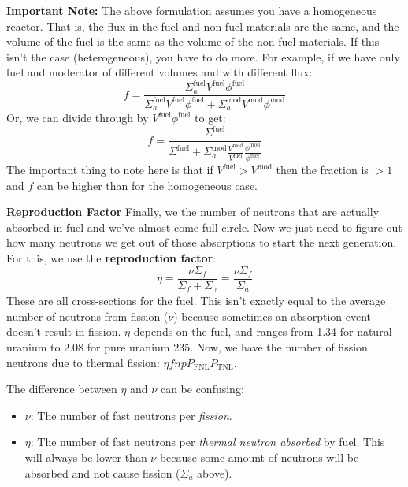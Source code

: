 \documentclass[letter]{article}
\begin{document}
\begin{framed}
\textbf{Important Note:} The above formulation assumes you have a
homogeneous reactor. That is, the flux in the fuel and non-fuel
materials are the same, and the volume of the fuel is the same as the
volume of the non-fuel materials. If this isn't the case (heterogeneous), you have to
do more. For example, if we have only fuel and moderator of different
volumes and with different flux:
\begin{equation*}
  f=\frac{\Sigma^{\text{fuel}}_aV^{\text{fuel}}\phi^{\text{fuel}}}{\Sigma^{\text{fuel}}_aV^{\text{fuel}}\phi^{\text{fuel}}+\Sigma^{\text{mod}}_aV^{\text{mod}}\phi^{\text{mod}}}
\end{equation*}
Or, we can divide through by $V^{\text{fuel}}\phi^{\text{fuel}}$ to
get:
\begin{equation*}
  f=\frac{\Sigma^{\text{fuel}}}{\Sigma^{\text{fuel}}+\Sigma^{\text{mod}}_a\frac{V^{\text{mod}}}{V^{\text{fuel}}}\frac{\phi^{\text{mod}}}{\phi^{\text{fuel}}}}
\end{equation*}
The important thing to note here is that if
$V^{\text{fuel}}>V^{\text{mod}}$ then the fraction is $>1$ and $f$ can
be higher than for the homogeneous case.
\end{framed}

\textbf{Reproduction Factor}
Finally, we the number of neutrons that are actually absorbed in fuel
and we've almost come full circle. Now we just need to figure out how
many neutrons we get out of those absorptions to start the next
generation. For this, we use the \textbf{reproduction factor}:
\begin{equation*}
  \eta =\frac{\nu\Sigma_f}{\Sigma_f+\Sigma_\gamma}=\frac{\nu\Sigma_f}{\Sigma_a}
\end{equation*}
These are all cross-sections for the fuel. This isn't exactly equal to the average number of neutrons from
fission ($\nu$) because sometimes an absorption event doesn't result
in fission.  $\eta$ depends on
the fuel, and ranges from 1.34 for natural uranium to 2.08 for pure
uranium 235. Now, we have the number of fission neutrons due to
thermal fission: $\eta{}fnpP_{\text{FNL}}P_{\text{TNL}}$.
\begin{framed}
The difference between $\eta$ and $\nu$ can be confusing:
\begin{itemize}
\item $\nu$: The number of fast neutrons per \textit{fission}.
\item $\eta$: The number of fast neutrons per \textit{thermal neutron
    absorbed} by fuel. This will always be lower than $\nu$ because
  some amount of neutrons will be absorbed and not cause fission
  ($\Sigma_a$ above).
\end{itemize}
\end{framed}
\end{document}
